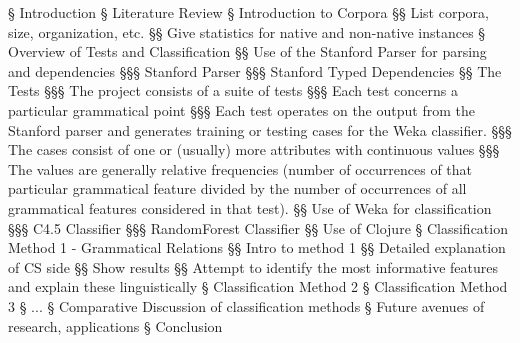 \documentclass[12pt]{article}
\begin{document}
\begin{easylist}
§ Introduction
§ Literature Review
§ Introduction to Corpora
§§ List corpora, size, organization, etc.
§§ Give statistics for native and non-native instances
§ Overview of Tests and Classification
§§ Use of the Stanford Parser for parsing and dependencies
§§§ Stanford Parser
§§§ Stanford Typed Dependencies
§§ The Tests
§§§ The project consists of a suite of tests
§§§ Each test concerns a particular grammatical point
§§§ Each test operates on the output from the Stanford parser and generates training or testing cases for the Weka classifier.
§§§ The cases consist of one or (usually) more attributes with continuous values
§§§ The values are generally relative frequencies (number of occurrences of that particular grammatical feature divided by the number of occurrences of all grammatical features considered in that test).
§§ Use of Weka for classification
§§§ C4.5 Classifier
§§§ RandomForest Classifier
§§ Use of Clojure
§ Classification Method 1 - Grammatical Relations
§§ Intro to method 1
§§ Detailed explanation of CS side
§§ Show results
§§ Attempt to identify the most informative features and explain these linguistically
§ Classification Method 2
§ Classification Method 3
§ ...
§ Comparative Discussion of classification methods
§ Future avenues of research, applications
§ Conclusion
\end{easylist}
\end{document}

